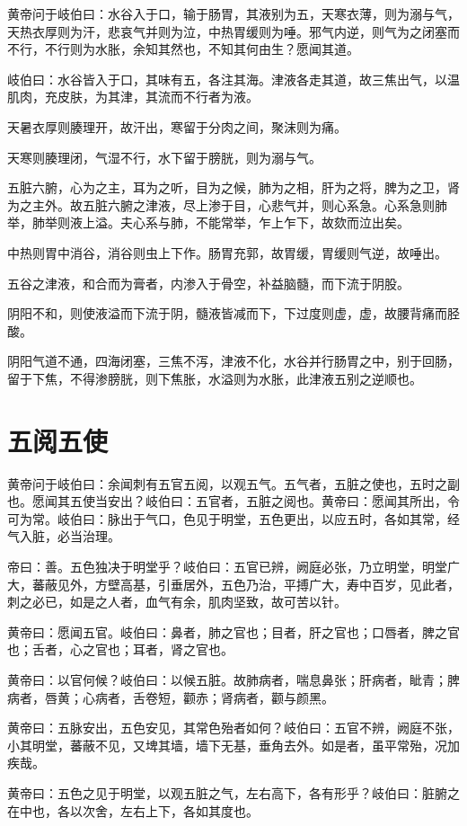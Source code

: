 \documentclass[12pt,UTF8]{ctexbook}
\begin{document}
	黄帝问于岐伯曰：水谷入于口，输于肠胃，其液别为五，天寒衣薄，则为溺与气，天热衣厚则为汗，悲哀气并则为泣，中热胃缓则为唾。邪气内逆，则气为之闭塞而不行，不行则为水胀，余知其然也，不知其何由生？愿闻其道。
	
	岐伯曰：水谷皆入于口，其味有五，各注其海。津液各走其道，故三焦出气，以温肌肉，充皮肤，为其津，其流而不行者为液。
	
	天暑衣厚则腠理开，故汗出，寒留于分肉之间，聚沫则为痛。
	
	天寒则腠理闭，气湿不行，水下留于膀胱，则为溺与气。
	
	五脏六腑，心为之主，耳为之听，目为之候，肺为之相，肝为之将，脾为之卫，肾为之主外。故五脏六腑之津液，尽上渗于目，心悲气并，则心系急。心系急则肺举，肺举则液上溢。夫心系与肺，不能常举，乍上乍下，故欬而泣出矣。
	
	中热则胃中消谷，消谷则虫上下作。肠胃充郭，故胃缓，胃缓则气逆，故唾出。
	
	五谷之津液，和合而为膏者，内渗入于骨空，补益脑髓，而下流于阴股。
	
	阴阳不和，则使液溢而下流于阴，髓液皆减而下，下过度则虚，虚，故腰背痛而胫酸。
	
	阴阳气道不通，四海闭塞，三焦不泻，津液不化，水谷并行肠胃之中，别于回肠，留于下焦，不得渗膀胱，则下焦胀，水溢则为水胀，此津液五别之逆顺也。
	\chapter{五阅五使}
	
	黄帝问于岐伯曰：余闻刺有五官五阅，以观五气。五气者，五脏之使也，五时之副也。愿闻其五使当安出？岐伯曰：五官者，五脏之阅也。黄帝曰：愿闻其所出，令可为常。岐伯曰：脉出于气口，色见于明堂，五色更出，以应五时，各如其常，经气入脏，必当治理。
	
	帝曰：善。五色独决于明堂乎？岐伯曰：五官已辨，阙庭必张，乃立明堂，明堂广大，蕃蔽见外，方壁高基，引垂居外，五色乃治，平搏广大，寿中百岁，见此者，刺之必已，如是之人者，血气有余，肌肉坚致，故可苦以针。
	
	黄帝曰：愿闻五官。岐伯曰：鼻者，肺之官也；目者，肝之官也；口唇者，脾之官也；舌者，心之官也；耳者，肾之官也。
	
	黄帝曰：以官何候？岐伯曰：以候五脏。故肺病者，喘息鼻张；肝病者，眦青；脾病者，唇黄；心病者，舌卷短，颧赤；肾病者，颧与颜黑。
	
	黄帝曰：五脉安出，五色安见，其常色殆者如何？岐伯曰：五官不辨，阙庭不张，小其明堂，蕃蔽不见，又埤其墙，墙下无基，垂角去外。如是者，虽平常殆，况加疾哉。
	
	黄帝曰：五色之见于明堂，以观五脏之气，左右高下，各有形乎？岐伯曰：脏腑之在中也，各以次舍，左右上下，各如其度也。
	
\end{document}
